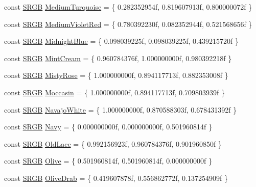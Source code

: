 \begin{DoxyCompactItemize}
\item 
const \hyperlink{structmage_1_1_s_r_g_b}{S\+R\+GB} \hyperlink{namespacemage_1_1color_aff861d171c3720c479662666c6bdf797}{Medium\+Turquoise} = \{ 0.\+282352954f, 0.\+819607913f, 0.\+800000072f \}
\item 
const \hyperlink{structmage_1_1_s_r_g_b}{S\+R\+GB} \hyperlink{namespacemage_1_1color_a025756a0d147c1a4b91e275c91ea27ec}{Medium\+Violet\+Red} = \{ 0.\+780392230f, 0.\+082352944f, 0.\+521568656f \}
\item 
const \hyperlink{structmage_1_1_s_r_g_b}{S\+R\+GB} \hyperlink{namespacemage_1_1color_a0216603e410d1bc24cafa0972b9bcc29}{Midnight\+Blue} = \{ 0.\+098039225f, 0.\+098039225f, 0.\+439215720f \}
\item 
const \hyperlink{structmage_1_1_s_r_g_b}{S\+R\+GB} \hyperlink{namespacemage_1_1color_aa57f7772d74e242e8d98895bc43d87bd}{Mint\+Cream} = \{ 0.\+960784376f, 1.\+000000000f, 0.\+980392218f \}
\item 
const \hyperlink{structmage_1_1_s_r_g_b}{S\+R\+GB} \hyperlink{namespacemage_1_1color_a6ae85af4c27f0e64ae516c2521b37c3c}{Misty\+Rose} = \{ 1.\+000000000f, 0.\+894117713f, 0.\+882353008f \}
\item 
const \hyperlink{structmage_1_1_s_r_g_b}{S\+R\+GB} \hyperlink{namespacemage_1_1color_a05be0c04a51144f0864df90143fa0b3c}{Moccasin} = \{ 1.\+000000000f, 0.\+894117713f, 0.\+709803939f \}
\item 
const \hyperlink{structmage_1_1_s_r_g_b}{S\+R\+GB} \hyperlink{namespacemage_1_1color_a456a2a2bd5e2ddd926237e13027d4123}{Navajo\+White} = \{ 1.\+000000000f, 0.\+870588303f, 0.\+678431392f \}
\item 
const \hyperlink{structmage_1_1_s_r_g_b}{S\+R\+GB} \hyperlink{namespacemage_1_1color_a309c380f757119928cd357c51d789708}{Navy} = \{ 0.\+000000000f, 0.\+000000000f, 0.\+501960814f \}
\item 
const \hyperlink{structmage_1_1_s_r_g_b}{S\+R\+GB} \hyperlink{namespacemage_1_1color_afb6a94c9a691ac340ecf5ed94af052c5}{Old\+Lace} = \{ 0.\+992156923f, 0.\+960784376f, 0.\+901960850f \}
\item 
const \hyperlink{structmage_1_1_s_r_g_b}{S\+R\+GB} \hyperlink{namespacemage_1_1color_a9dde379c69800de744e90a45b4bbbe0f}{Olive} = \{ 0.\+501960814f, 0.\+501960814f, 0.\+000000000f \}
\item 
const \hyperlink{structmage_1_1_s_r_g_b}{S\+R\+GB} \hyperlink{namespacemage_1_1color_a77c1bc650b6099a4f9a83e295c8275fe}{Olive\+Drab} = \{ 0.\+419607878f, 0.\+556862772f, 0.\+137254909f \}
\item 

\end{DoxyCompactItemize}
